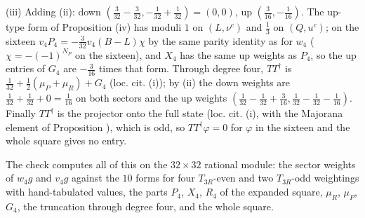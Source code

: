 (iii) Adding (ii): down $(\tfrac{3}{32} - \tfrac{3}{32}, -\tfrac{1}{32} + \tfrac{1}{32}) = (0, 0)$, up $(\tfrac{3}{16}, -\tfrac{1}{16})$. The up-type form of Proposition (iv) has moduli $1$ on $(L, \nu^{c})$ and $\tfrac13$ on $(Q, u^{c})$; on the sixteen $v_{4}P_{4} = -\tfrac{3}{32}v_{4}(B - L)\chi$ by the same parity identity as for $w_{4}$ ($\chi = -(-1)^{N_{P}}$ on the sixteen), and $X_{4}$ has the same up weights as $P_{4}$, so the up entries of $G_{4}$ are $-\tfrac{3}{16}$ times that form. Through degree four, $TT^{\dagger}$ is $\tfrac{1}{32} + \tfrac12(\mu_{P} + \mu_{R}) + G_{4}$ (loc. cit. (i)); by (ii) the down weights are $\tfrac{1}{32} + \tfrac{1}{32} + 0 = \tfrac{1}{16}$ on both sectors and the up weights $(\tfrac{1}{32} - \tfrac{1}{32} + \tfrac{3}{16}, \tfrac{1}{32} - \tfrac{1}{32} - \tfrac{1}{16})$. Finally $TT^{\dagger}$ is the projector onto the full state (loc. cit. (i), with the Majorana element of Proposition ), which is odd, so $TT^{\dagger}\varphi = 0$ for $\varphi$ in the sixteen and the whole square gives no entry.

The check computes all of this on the $32 \times 32$ rational module: the sector weights of $w_{4}g$ and $v_{4}g$ against the $10$ forms for four $T_{3R}$-even and two $T_{3R}$-odd weightings with hand-tabulated values, the parts $P_{4}$, $X_{4}$, $R_{4}$ of the expanded square, $\mu_{R}$, $\mu_{P}$, $G_{4}$, the truncation through degree four, and the whole square.
